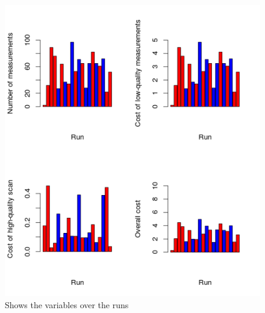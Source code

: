 \documentclass{article}
\begin{document}
\begin{multicols*}{2}
\begin{flushleft}
\begin{flushleft}
\begin{figure}[H]
	\begin{center}
		\includegraphics[scale=0.5]{plotm2p1.png}
	\end{center}
	\caption{Shows the variables over the runs}
\end{figure}


\end{flushleft}
\end{flushleft}
\end{multicols*}
\end{document}
